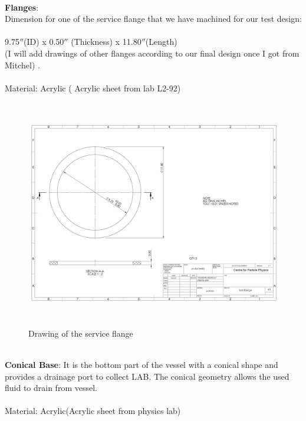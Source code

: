 %
\\
\textbf{Flanges}:\\
Dimension for one of the service flange that we have machined for our test design:\\
\\
9.75$''$(ID) x 0.50$''$ (Thickness) x 11.80$''$(Length) \\
(I will add drawings of other flanges according to our final design once I got from Mitchel) .\\
\\
Material: Acrylic ( Acrylic sheet from lab L2-92)\\
\begin{figure}[!htpb]
  \centering
  \includegraphics[width = 12cm, height=10cm ]{figures/flange}
  \caption{Drawing of the service flange}
  \label{fig:flange}
\end{figure}\\
\textbf{Conical Base}:
It is the bottom part of the vessel with a conical shape and provides a drainage port to collect LAB. The conical geometry allows the used fluid to drain from vessel.\\
\\
Material: Acrylic(Acrylic sheet from physics lab)\\
